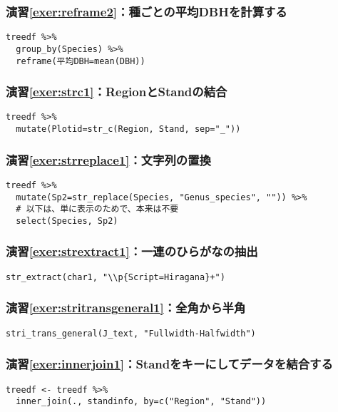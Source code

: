     \subsubsection*{演習\ref{exer:reframe2}：種ごとの平均DBHを計算する}
\begin{verbatim}
treedf %>%
  group_by(Species) %>%
  reframe(平均DBH=mean(DBH))
\end{verbatim}

    \subsubsection*{演習\ref{exer:strc1}：RegionとStandの結合}
\begin{verbatim}
treedf %>%
  mutate(Plotid=str_c(Region, Stand, sep="_"))
\end{verbatim}

    \subsubsection*{演習\ref{exer:strreplace1}：文字列の置換}
\begin{verbatim}
treedf %>%
  mutate(Sp2=str_replace(Species, "Genus_species", "")) %>%
  # 以下は、単に表示のためで、本来は不要
  select(Species, Sp2)
\end{verbatim}

    \subsubsection*{演習\ref{exer:strextract1}：一連のひらがなの抽出}
\begin{verbatim}
str_extract(char1, "\\p{Script=Hiragana}+")
\end{verbatim}

    \subsubsection*{演習\ref{exer:stritransgeneral1}：全角から半角}
\begin{verbatim}
stri_trans_general(J_text, "Fullwidth-Halfwidth")
\end{verbatim}

    \subsubsection*{演習\ref{exer:innerjoin1}：Standをキーにしてデータを結合する}
\begin{verbatim}
treedf <- treedf %>%
  inner_join(., standinfo, by=c("Region", "Stand"))
\end{verbatim}

